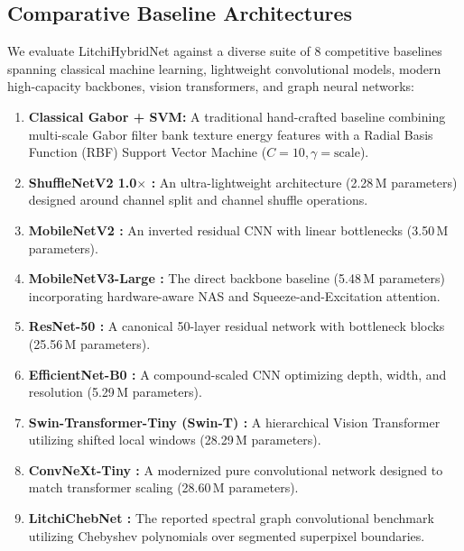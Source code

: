 \subsection{Comparative Baseline Architectures}
We evaluate LitchiHybridNet against a diverse suite of 8 competitive baselines spanning classical machine learning, lightweight convolutional models, modern high-capacity backbones, vision transformers, and graph neural networks:
\begin{enumerate}
    \item \textbf{Classical Gabor + SVM:} A traditional hand-crafted baseline combining multi-scale Gabor filter bank texture energy features with a Radial Basis Function (RBF) Support Vector Machine ($C=10, \gamma=\text{scale}$).
    \item \textbf{ShuffleNetV2 1.0$\times$ \cite{ma2018shufflenet}:} An ultra-lightweight architecture (2.28\,M parameters) designed around channel split and channel shuffle operations.
    \item \textbf{MobileNetV2 \cite{sandler2018mobilenetv2}:} An inverted residual CNN with linear bottlenecks (3.50\,M parameters).
    \item \textbf{MobileNetV3-Large \cite{howard2019searching}:} The direct backbone baseline (5.48\,M parameters) incorporating hardware-aware NAS and Squeeze-and-Excitation attention.
    \item \textbf{ResNet-50 \cite{he2016deep}:} A canonical 50-layer residual network with bottleneck blocks (25.56\,M parameters).
    \item \textbf{EfficientNet-B0 \cite{tan2019efficientnet}:} A compound-scaled CNN optimizing depth, width, and resolution (5.29\,M parameters).
    \item \textbf{Swin-Transformer-Tiny (Swin-T) \cite{liu2021swin}:} A hierarchical Vision Transformer utilizing shifted local windows (28.29\,M parameters).
    \item \textbf{ConvNeXt-Tiny \cite{liu2022convnet}:} A modernized pure convolutional network designed to match transformer scaling (28.60\,M parameters).
    \item \textbf{LitchiChebNet \cite{litchi_dataset_2022}:} The reported spectral graph convolutional benchmark utilizing Chebyshev polynomials over segmented superpixel boundaries.
\end{enumerate}


